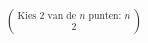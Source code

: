 \documentclass[preview]{standalone}
\begin{document}
\begin{align*}
\text{Kies }2\text{ van de }n\text{ punten: }n\choose 2
\end{align*}
\end{document}
